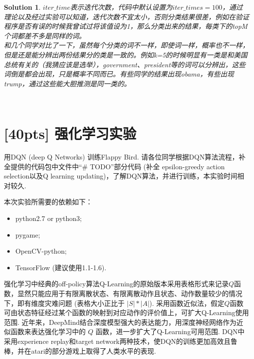 \documentclass[a4paper,UTF8]{article}
\numberwithin{equation}{section}
\newtheorem*{mySol}{Solution}
\begin{document}
\begin{mySol}
	$iter\_time$表示迭代次数，代码中默认设置为$iter\_times=100$，通过理论以及经过实验可以知道，迭代次数不宜太小，否则分类结果很差，例如在验证程序是否有误的时候我曾试过将该值设为1，那么分类出来的结果，每类下的topM个词都差不多是同样的词。 \\
	
	和几个同学对比了一下，虽然每个分类的词不一样，即使词一样，概率也不一样，但是还是能分辨出两份结果分的类是一致的。例如k=5的时候明显有一类是和美国总统有关的（我猜应该是选举），government、president等的词可以分辨出，这些词倒是都会出现，只是概率不同而已。有些同学的结果出现obama，有些出现trump，通过这些能大胆推测是同一类的。\\

\end{mySol}

\newpage
\ \\
\newpage

\section{[40pts] 强化学习实验}
用DQN (deep Q Networks) 训练Flappy Bird. 请各位同学根据DQN算法流程，补全提供的代码包中文件中“\# TODO”部分代码 (补全 epsilon-greedy action selection以及Q learning updating)，了解DQN算法，并进行训练，本实验时间相对较久.

本次实验所需要的依赖如下：
\begin{itemize}
	\item python2.7 or python3;
	\item pygame;
	\item OpenCV-python;
	\item TensorFlow (建议使用1.1-1.6).
\end{itemize}

强化学习中经典的off-policy算法Q-Learning的原始版本采用表格形式来记录$Q$函数，显然只能应用于有限离散状态、有限离散动作且状态、动作数量较少的情况下，即有维度灾难问题 (表格大小正比于 $|S|*|A|$). 采用函数近似法，假定$Q$函数可由状态特征经过某个函数的映射到对应动作的评价值上，可扩大Q-Learning使用范围. 近年来，DeepMind结合深度模型强大的表达能力，用深度神经网络作为近似函数来表达强化学习中的 $Q$ 函数，进一步扩大了Q-Learning可用范围. DQN中采用experience replay和target network两种技术，使DQN的训练更加高效且鲁棒，并在atari的部分游戏上取得了人类水平的表现.
\end{document}
